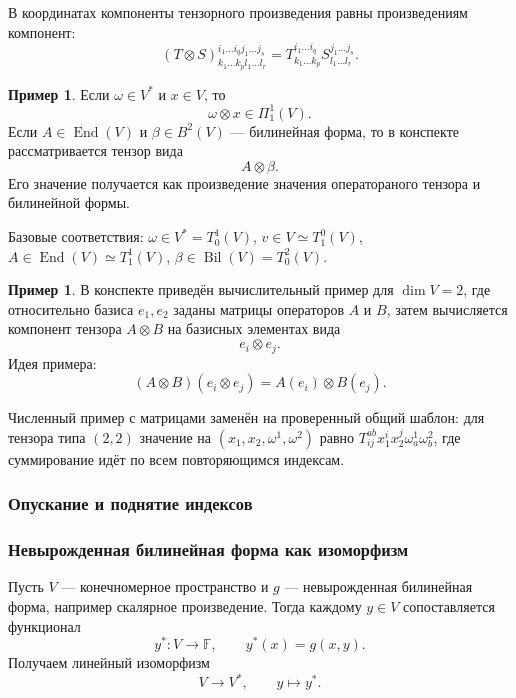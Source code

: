 \documentclass[12pt,a4paper]{article}
\theoremstyle{definition}
\newtheorem{example}[definition]{Пример}
\theoremstyle{plain}
\theoremstyle{remark}
\newenvironment{knowledgefix}{\begin{clarifybox}}{\end{clarifybox}}
\newcommand{\F}{\mathbb{F}}
\newcommand{\End}{\operatorname{End}}
\newcommand{\Tens}[2]{\Pi^{#2}_{#1}(V)}
\begin{document}
В координатах компоненты тензорного произведения равны произведениям компонент:
\[
    (T\otimes S)^{i_1\ldots i_q j_1\ldots j_s}_{k_1\ldots k_p l_1\ldots l_r}
    =
    T^{i_1\ldots i_q}_{k_1\ldots k_p}
    S^{j_1\ldots j_s}_{l_1\ldots l_r}.
\]

\begin{example}
Если $\omega\in V^*$ и $x\in V$, то
\[
    \omega\otimes x\in \Tens{1}{1}.
\]
Если $A\in\End(V)$ и $\beta\in B^2(V)$ --- билинейная форма, то в конспекте рассматривается тензор вида
\[
    A\otimes \beta.
\]
Его значение получается как произведение значения оператораного тензора и билинейной формы.
\begin{knowledgefix}
Базовые соответствия: \(\omega\in V^*=T^1_0(V)\), \(v\in V\simeq T^0_1(V)\), \(A\in\End(V)\simeq T^1_1(V)\), \(\beta\in\operatorname{Bil}(V)=T^2_0(V)\).
\end{knowledgefix}
\end{example}

\begin{example}
В конспекте приведён вычислительный пример для $\dim V=2$, где относительно базиса $e_1,e_2$ заданы матрицы операторов $A$ и $B$, затем вычисляется компонент тензора $A\otimes B$ на базисных элементах вида
\[
    e_i\otimes e_j.
\]
Идея примера:
\[
    (A\otimes B)(e_i\otimes e_j)=A(e_i)\otimes B(e_j).
\]
\begin{knowledgefix}
Численный пример с матрицами заменён на проверенный общий шаблон: для тензора типа \((2,2)\) значение на \((x_1,x_2,\omega^1,\omega^2)\) равно \(T^{ab}_{ij}x_1^i x_2^j\omega^1_a\omega^2_b\), где суммирование идёт по всем повторяющимся индексам.
\end{knowledgefix}
\end{example}

\subsubsection{Опускание и поднятие индексов}

\subsubsection*{Невырожденная билинейная форма как изоморфизм}

Пусть $V$ --- конечномерное пространство и $g$ --- невырожденная билинейная форма, например скалярное произведение.
Тогда каждому $y\in V$ сопоставляется функционал
\[
    y^*\colon V\to\F,
    \qquad
    y^*(x)=g(x,y).
\]
Получаем линейный изоморфизм
\[
    V\longrightarrow V^*,
    \qquad
    y\longmapsto y^*.
\]
\end{document}
